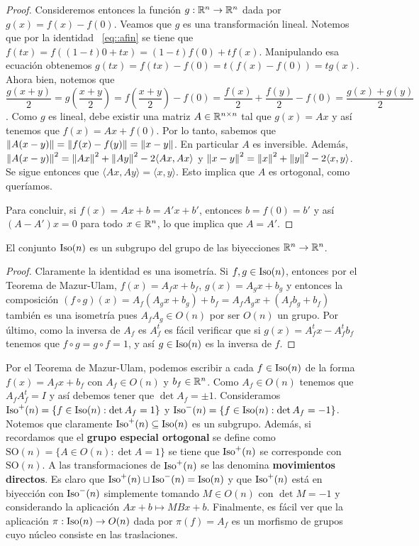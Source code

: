 \begin{teo}
\begin{proof}
Consideremos entonces la función $g:\mathbb{R}^n\to\mathbb{R}^n$ dada por $g(x)=f(x)-f(0)$. Veamos que $g$ es una transformación lineal. Notemos que por la identidad ~\ref{eq::afin} se tiene que $f(tx)=f((1-t)0 + tx) = (1-t)f(0) + tf(x)$. Manipulando esa ecuación obtenemos $g(tx)=f(tx)-f(0)=t(f(x)-f(0))=tg(x)$. Ahora bien, notemos que $\dfrac{g(x+y)}{2}=g\left(\dfrac{x+y}{2}\right) = f\left(\dfrac{x+y}{2}\right)-f(0) = \dfrac{f(x)}{2}+\dfrac{f(y)}{2}-f(0) = \dfrac{g(x)+g(y)}{2}$. Como $g$ es lineal, debe existir una matriz $A\in\mathbb{R}^{n\times n}$ tal que $g(x)=Ax$ y así tenemos que $f(x)=Ax+f(0)$.
Por lo tanto, sabemos que $\left\| A(x-y) \right\| = \left\| f(x)-f(y) \right\| = \left\| x-y \right\|$. En particular $A$ es inversible. Además, $\left\| A(x-y) \right\|^2 = \left\| Ax \right\|^2 + \left\| Ay \right\|^2 - 2\langle Ax,Ax\rangle$ y $\left\| x-y \right\|^2 = \left\| x \right\|^2 + \left\| y \right\|^2 - 2\langle x,y\rangle$. Se sigue entonces que $\langle Ax,Ay\rangle = \langle x,y\rangle$. Esto implica que $A$ es ortogonal, como queríamos.

Para concluir, si $f(x)=Ax+b=A'x+b'$, entonces $b=f(0)=b'$ y así $(A-A')x=0$ para todo $x\in\mathbb{R}^n$, lo que implica que $A=A'$.
\end{proof}
\end{teo}

\begin{cor}
El conjunto $\operatorname{Iso}(n)$ es un subgrupo del grupo de las biyecciones $\mathbb{R}^n\to\mathbb{R}^n$.
\begin{proof}
Claramente la identidad es una isometría. Si $f,g\in\operatorname{Iso}(n)$, entonces por el Teorema de Mazur-Ulam, $f(x)=A_fx+b_f$, $g(x)=A_gx+b_g$ y entonces la composición $(f\circ g)(x) = A_f(A_gx+b_g)+b_f = A_fA_gx + (A_fb_g+b_f)$ también es una isometría pues $A_fA_g\in O(n)$ por ser $O(n)$ un grupo. Por último, como la inversa de $A_f$ es $A_f^t$ es fácil verificar que si $g(x) = A_f^t x - A_f^t b_f$ tenemos que $f\circ g = g\circ f = 1$, y así $g\in\operatorname{Iso}(n)$ es la inversa de $f$.
\end{proof}
\end{cor}

Por el Teorema de Mazur-Ulam, podemos escribir a cada $f\in\operatorname{Iso}(n)$ de la forma $f(x)=A_fx+b_f$ con $A_f\in O(n)$ y $b_f\in\mathbb{R}^n$. Como $A_f\in O(n)$ tenemos que $A_f A_f^t = I$ y así debemos tener que $\det A_f = \pm 1$. Consideramos $\operatorname{Iso}^+(n) = \{f\in\operatorname{Iso}(n) : \det A_f = 1\}$ y $\operatorname{Iso}^-(n) = \{f\in\operatorname{Iso}(n):\det A_f = -1\}$. Notemos que claramente $\operatorname{Iso}^+(n)\subseteq\operatorname{Iso}(n)$ es un subgrupo. Además, si recordamos que el \textbf{grupo especial ortogonal} se define como $\mathrm{SO}(n)=\{A\in O(n) : \det A = 1\}$ se tiene que $\operatorname{Iso}^+(n)$ se corresponde con $\mathrm{SO}(n)$. A las transformaciones de $\operatorname{Iso}^+(n)$ se las denomina \textbf{movimientos directos}. Es claro que $\operatorname{Iso}^+(n)\sqcup\operatorname{Iso}^-(n)=\operatorname{Iso}(n)$ y que $\operatorname{Iso}^+(n)$ está en biyección con $\operatorname{Iso}^-(n)$ simplemente tomando $M\in O(n)$ con $\det M = -1$ y considerando la aplicación $Ax+b\mapsto MBx+b$. Finalmente, es fácil ver que la aplicación $\pi:\operatorname{Iso}(n)\to O(n)$ dada por $\pi(f)=A_f$ es un morfismo de grupos cuyo núcleo consiste en las traslaciones.

